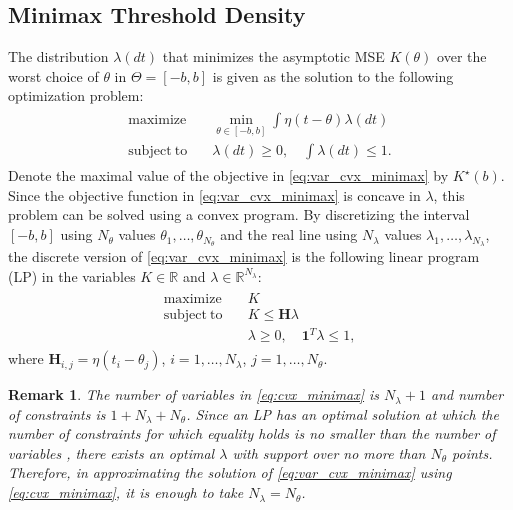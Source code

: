 \documentclass[letterpaper, conference, 11pt]{IEEEtran}      %
\newtheorem{rem}{\bf {Remark}}
\begin{document}
\subsection{Minimax Threshold Density}
The distribution $\lambda(dt)$ that minimizes the asymptotic MSE $K(\theta)$ over the worst choice of $\theta$ in $\Theta = [-b,b]$ is given as the solution to the following optimization problem:
\begin{align}
\label{eq:var_cvx_minimax}
\begin{split}
\mathrm{maximize} \quad &  \min_{\theta \in [-b,b]} \int \eta(t-\theta) \lambda(dt)
\\ 
\mathrm{subject~to} 
\quad & \lambda(dt)\geq 0,\quad \int \lambda(dt) \leq 1. 
\end{split}
\end{align}
Denote the maximal value of the objective in \eqref{eq:var_cvx_minimax} by $K^\star(b)$. Since the objective function in \eqref{eq:var_cvx_minimax} is concave in $\lambda$, this problem can be solved using a convex program. By discretizing the interval $[-b,b]$ using $N_\theta$ values $\theta_1,\ldots,\theta_{N_\theta}$ and the real line using $N_\lambda$ values $\lambda_1,\ldots,\lambda_{N_\lambda}$, the discrete version of \eqref{eq:var_cvx_minimax} is the following linear program (LP) in the variables $K \in \mathbb R$ and $\lambda \in \mathbb R^{N_\lambda}$:
\begin{align}
\label{eq:cvx_minimax}
\begin{split}
\mathrm{maximize} \quad &  K \\ 
\mathrm{subject~to} 
\quad &  K \leq \mathbf H\lambda \\
& \lambda \geq 0,\quad   \mathbf 1^T\lambda  \leq 1,
\end{split}
\end{align}
where $\mathbf H_{i,j} = \eta(t_i - \theta_j)$, $i=1,\ldots,N_\lambda$, $j = 1,\ldots,N_\theta$. 
\begin{rem}
The number of variables in \eqref{eq:cvx_minimax} is $N_\lambda+1$ and number of constraints is $1 + N_\lambda + N_\theta$. Since an LP has an optimal solution at which the number of constraints for which equality holds is no smaller than the number of variables \cite{papadimitriou1998combinatorial}, there exists an optimal $\lambda$ with support over no more than $N_{\theta}$ points. Therefore, in approximating the solution of \eqref{eq:var_cvx_minimax} using 
\eqref{eq:cvx_minimax}, it is enough to take $N_\lambda = N_\theta$.
\end{rem} 
\end{document}
